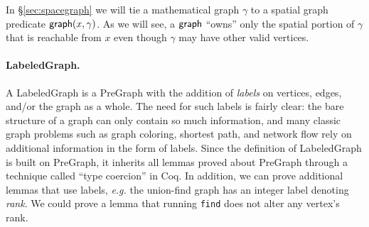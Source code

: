 \hide
{In \S\ref{sec:spacegraph} we will tie a mathematical graph $\gamma$ to 
a spatial graph predicate
$\mathsf{graph}(x, \gamma)$.   As we will see, a $\mathsf{graph}$ ``owns'' only the
spatial portion of $\gamma$ that is reachable
from $x$ even though $\gamma$ may have other valid vertices.
} %
\fi


\vspace{-0.75ex}

\paragraph{LabeledGraph.}
A LabeledGraph is a PreGraph with the addition of \emph{labels} on
vertices, edges, and/or the graph as a whole. The need for such labels
is fairly clear: the bare structure of a graph can only contain so
much information, and many classic graph problems such as graph
coloring, shortest path, and network flow rely on additional
information in the form of labels. Since the definition of
LabeledGraph is built on PreGraph, it inherits all lemmas proved about
PreGraph through a technique called ``type coercion'' in Coq. In
addition, we can prove additional lemmas that use labels,
\emph{e.g.} the union-find graph has an integer label denoting \emph{rank}.
We could prove a lemma that running \texttt{find} does not alter
any vertex's rank.


\iffalse
\paragraph{LabeledGraph.}
A LabeledGraph is a PreGraph with the addition of \emph{labels} on 
vertices, edges, and/or the graph as a whole. The need for such labels
is fairly clear; the bare structure of a graph can only 
contain so much information, and many classic graph problems 
such as graph coloring, shortest path, and network flow rely on 
additional information in the form of labels. In our architecture, a
LabeledGraph inherits any lemmas proved about its associated PreGraph. 
In addition, we can define additional lemmas that use labels, 
\emph{e.g.} the union-find graph has an integer label denoting \emph{rank}.
We could prove a lemma that running \texttt{find} does not alter
any vertex's rank. 
\hide{add string labels to edges and reason about a trie.}
\fi


